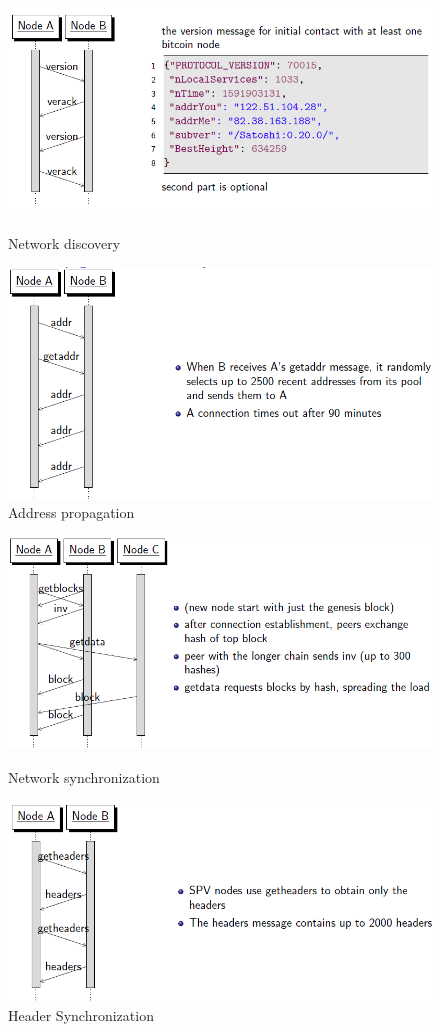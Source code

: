 \documentclass{article}
\begin{document}
\begin{figure}[h!]
\includegraphics[scale=0.6]{30.png}
\caption{Network discovery}
\includegraphics[scale=0.6]{31.png}
\caption{Address propagation}
\end{figure}

\begin{figure}
\includegraphics[scale=0.6]{32.png}
\caption{Network synchronization}
\includegraphics[scale=0.6]{33.png}
\caption{Header Synchronization}
\end{figure}
\end{document}
